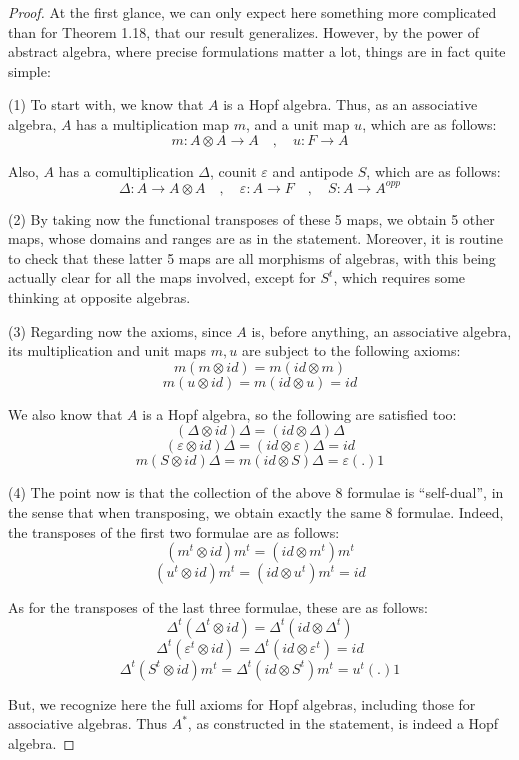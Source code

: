 \documentclass[12pt]{amsbook}
\begin{document}
\begin{proof}
At the first glance, we can only expect here something more complicated than for Theorem 1.18, that our result generalizes. However, by the power of abstract algebra, where precise formulations matter a lot, things are in fact quite simple:

\medskip

(1) To start with, we know that $A$ is a Hopf algebra. Thus, as an associative algebra, $A$ has a multiplication map $m$, and a unit map $u$, which are as follows:
$$m:A\otimes A\to A\quad,\quad u:F\to A$$

Also, $A$ has a comultiplication $\Delta$, counit $\varepsilon$ and antipode $S$, which are as follows:
$$\Delta:A\to A\otimes A\quad,\quad\varepsilon:A\to F\quad,\quad S:A\to A^{opp}$$

(2) By taking now the functional transposes of these 5 maps, we obtain 5 other maps, whose domains and ranges are as in the statement. Moreover, it is routine to check that these latter 5 maps are all morphisms of algebras, with this being actually clear for all the maps involved, except for $S^t$, which requires some thinking at opposite algebras.

\medskip

(3) Regarding now the axioms, since $A$ is, before anything, an associative algebra, its multiplication and unit maps $m,u$ are subject to the following axioms:
$$m(m\otimes id)=m(id\otimes m)$$
$$m(u\otimes id)=m(id\otimes u)=id$$

We also know that $A$ is a Hopf algebra, so the following are satisfied too:
$$(\Delta\otimes id)\Delta=(id\otimes \Delta)\Delta$$
$$(\varepsilon\otimes id)\Delta=(id\otimes\varepsilon)\Delta=id$$
$$m(S\otimes id)\Delta=m(id\otimes S)\Delta=\varepsilon(.)1$$

(4) The point now is that the collection of the above 8 formulae is ``self-dual'', in the sense that when transposing, we obtain exactly the same 8 formulae. Indeed, the transposes of the first two formulae are as follows:
$$(m^t\otimes id)m^t=(id\otimes m^t)m^t$$
$$(u^t\otimes id)m^t=(id\otimes u^t)m^t=id$$

As for the transposes of the last three formulae, these are as follows:
$$\Delta^t(\Delta^t\otimes id)=\Delta^t(id\otimes\Delta^t)$$
$$\Delta^t(\varepsilon^t\otimes id)=\Delta^t(id\otimes\varepsilon^t)=id$$
$$\Delta^t(S^t\otimes id)m^t=\Delta^t(id\otimes S^t)m^t=u^t(.)1$$

But, we recognize here the full axioms for Hopf algebras, including those for associative algebras. Thus $A^*$, as constructed in the statement, is indeed a Hopf algebra. 


\end{proof}
\end{document}

